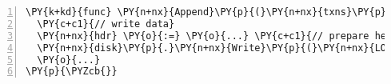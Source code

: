 \begin{Verbatim}[commandchars=\\\{\},numbers=left,firstnumber=1,stepnumber=1,codes={\catcode`\$=3\catcode`\^=7\catcode`\_=8},fontsize=\small,numbersep=6pt,xleftmargin=0.2in]
\PY{k+kd}{func} \PY{n+nx}{Append}\PY{p}{(}\PY{n+nx}{txns}\PY{p}{)} \PY{p}{\PYZob{}}
  \PY{c+c1}{// write data}
  \PY{n+nx}{hdr} \PY{o}{:=} \PY{o}{...} \PY{c+c1}{// prepare header}
  \PY{n+nx}{disk}\PY{p}{.}\PY{n+nx}{Write}\PY{p}{(}\PY{n+nx}{LOGHDR}\PY{p}{,} \PY{n+nx}{hdr}\PY{p}{)}
  \PY{o}{...}
\PY{p}{\PYZcb{}}
\end{Verbatim}
